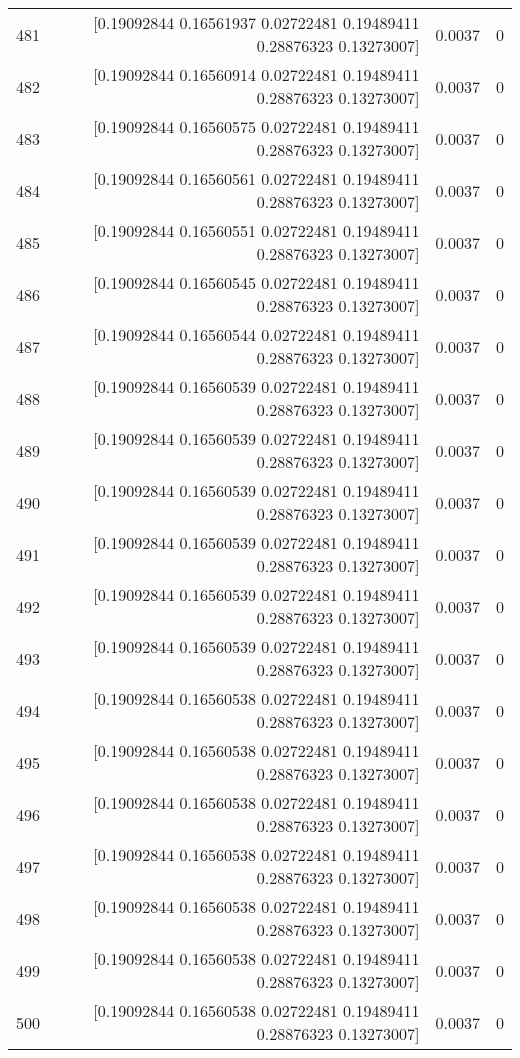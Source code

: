 \begin{longtable}{lrrr}
481 & [0.19092844 0.16561937 0.02722481 0.19489411 0.28876323 0.13273007] & 0.0037 & 0 \\
482 & [0.19092844 0.16560914 0.02722481 0.19489411 0.28876323 0.13273007] & 0.0037 & 0 \\
483 & [0.19092844 0.16560575 0.02722481 0.19489411 0.28876323 0.13273007] & 0.0037 & 0 \\
484 & [0.19092844 0.16560561 0.02722481 0.19489411 0.28876323 0.13273007] & 0.0037 & 0 \\
485 & [0.19092844 0.16560551 0.02722481 0.19489411 0.28876323 0.13273007] & 0.0037 & 0 \\
486 & [0.19092844 0.16560545 0.02722481 0.19489411 0.28876323 0.13273007] & 0.0037 & 0 \\
487 & [0.19092844 0.16560544 0.02722481 0.19489411 0.28876323 0.13273007] & 0.0037 & 0 \\
488 & [0.19092844 0.16560539 0.02722481 0.19489411 0.28876323 0.13273007] & 0.0037 & 0 \\
489 & [0.19092844 0.16560539 0.02722481 0.19489411 0.28876323 0.13273007] & 0.0037 & 0 \\
490 & [0.19092844 0.16560539 0.02722481 0.19489411 0.28876323 0.13273007] & 0.0037 & 0 \\
491 & [0.19092844 0.16560539 0.02722481 0.19489411 0.28876323 0.13273007] & 0.0037 & 0 \\
492 & [0.19092844 0.16560539 0.02722481 0.19489411 0.28876323 0.13273007] & 0.0037 & 0 \\
493 & [0.19092844 0.16560539 0.02722481 0.19489411 0.28876323 0.13273007] & 0.0037 & 0 \\
494 & [0.19092844 0.16560538 0.02722481 0.19489411 0.28876323 0.13273007] & 0.0037 & 0 \\
495 & [0.19092844 0.16560538 0.02722481 0.19489411 0.28876323 0.13273007] & 0.0037 & 0 \\
496 & [0.19092844 0.16560538 0.02722481 0.19489411 0.28876323 0.13273007] & 0.0037 & 0 \\
497 & [0.19092844 0.16560538 0.02722481 0.19489411 0.28876323 0.13273007] & 0.0037 & 0 \\
498 & [0.19092844 0.16560538 0.02722481 0.19489411 0.28876323 0.13273007] & 0.0037 & 0 \\
499 & [0.19092844 0.16560538 0.02722481 0.19489411 0.28876323 0.13273007] & 0.0037 & 0 \\
500 & [0.19092844 0.16560538 0.02722481 0.19489411 0.28876323 0.13273007] & 0.0037 & 0 \\
\end{longtable}
